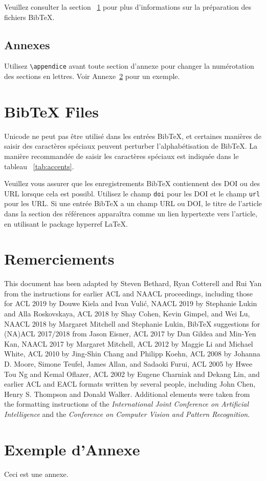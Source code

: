 \documentclass[11pt,french]{article}
\begin{document}
Veuillez consulter la section ~\ref{sec:bibtex} pour plus d'informations sur la préparation des fichiers Bib\TeX{}.

\subsection{Annexes}

Utilisez \verb|\appendice| avant toute section d'annexe pour changer la numérotation des sections en lettres. Voir Annexe~\ref{sec:appendix} pour un exemple.

\section{Bib\TeX{} Files}
\label{sec:bibtex}

Unicode ne peut pas être utilisé dans les entrées Bib\TeX{}, et certaines manières de saisir des caractères spéciaux peuvent perturber l'alphabétisation de Bib\TeX. La manière recommandée de saisir les caractères spéciaux est indiquée dans le tableau ~\ref{tab:accents}.

Veuillez vous assurer que les enregistrements Bib\TeX{} contiennent des DOI ou des URL lorsque cela est possibl.
Utilisez le champ \verb|doi| pour les DOI et le champ \verb|url|  pour les URL.
Si une entrée Bib\TeX{} a un champ URL ou DOI, le titre de l'article dans la section des références apparaîtra comme un lien hypertexte vers l'article, en utilisant le package hyperref \LaTeX{}.

\section*{Remerciements}

This document has been adapted
by Steven Bethard, Ryan Cotterell and Rui Yan
from the instructions for earlier ACL and NAACL proceedings, including those for 
ACL 2019 by Douwe Kiela and Ivan Vuli\'{c},
NAACL 2019 by Stephanie Lukin and Alla Roskovskaya, 
ACL 2018 by Shay Cohen, Kevin Gimpel, and Wei Lu, 
NAACL 2018 by Margaret Mitchell and Stephanie Lukin,
Bib\TeX{} suggestions for (NA)ACL 2017/2018 from Jason Eisner,
ACL 2017 by Dan Gildea and Min-Yen Kan, 
NAACL 2017 by Margaret Mitchell, 
ACL 2012 by Maggie Li and Michael White, 
ACL 2010 by Jing-Shin Chang and Philipp Koehn, 
ACL 2008 by Johanna D. Moore, Simone Teufel, James Allan, and Sadaoki Furui, 
ACL 2005 by Hwee Tou Ng and Kemal Oflazer, 
ACL 2002 by Eugene Charniak and Dekang Lin, 
and earlier ACL and EACL formats written by several people, including
John Chen, Henry S. Thompson and Donald Walker.
Additional elements were taken from the formatting instructions of the \emph{International Joint Conference on Artificial Intelligence} and the \emph{Conference on Computer Vision and Pattern Recognition}.



\appendix

\section{Exemple d'Annexe}
\label{sec:appendix}

Ceci est une annexe.
\end{document}
